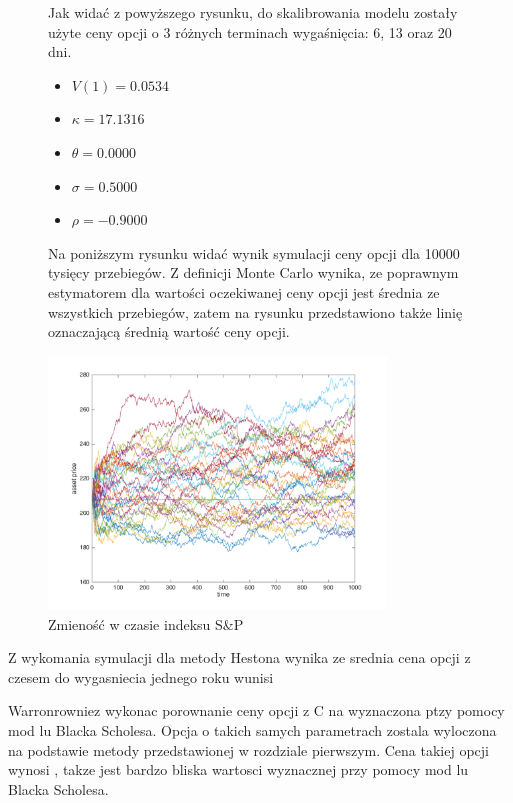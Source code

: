 \documentclass{pracamgr}
\begin{document}
\begin{figure}

Jak widać z powyższego rysunku, do skalibrowania modelu zostały użyte ceny 
opcji o 3 różnych terminach wygaśnięcia: 6, 13 oraz 20 dni.


\begin{itemize}
  \item $V(1) = 0.0534 $
  \item $\kappa = 17.1316$
  \item $\theta = 0.0000 $
  \item $\sigma = 0.5000$
  \item $\rho = -0.9000 $
\end{itemize}

 
Na poniższym rysunku widać wynik symulacji ceny opcji dla 10000 tysięcy przebiegów.
Z definicji Monte Carlo wynika, ze poprawnym estymatorem dla wartości oczekiwanej ceny
opcji jest średnia ze wszystkich przebiegów, zatem na rysunku przedstawiono także linię
oznaczającą średnią wartość ceny opcji. 


\centering
  \includegraphics[width=0.80\textwidth]{../chartHeston.png}
  \caption{Zmieność w czasie indeksu S\&P}
  \label{fig:data}
\end{figure}


Z wykomania symulacji dla metody Hestona wynika ze srednia cena opcji z czesem do wygasniecia jednego roku wunisi 

Warronrowniez wykonac porownanie ceny opcji z C na wyznaczona ptzy pomocy mod lu Blacka Scholesa. Opcja o takich samych parametrach zostala wyloczona na podstawie metody przedstawionej w rozdziale pierwszym. Cena takiej opcji wynosi , takze jest bardzo bliska wartosci wyznacznej przy pomocy mod lu Blacka Scholesa.
\end{document}
